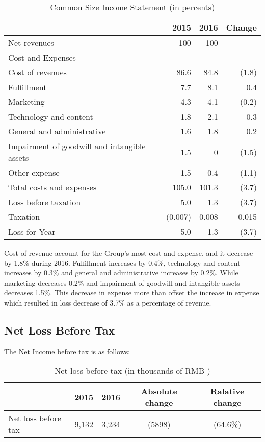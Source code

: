 \begin{table}[H]	
	\begin{center}
		\begin{tabular}{lrrr}
			\toprule
			&\textbf{2015}&\textbf{2016}&\textbf{Change}\\
			\midrule
			Net revenues&	100&	100&	-\\
			Cost and Expenses& & & \\			
			Cost of revenues&	86.6&	84.8&	(1.8)\\
			Fulfillment&7.7&	8.1	&	0.4\\
			Marketing&	4.3&	4.1	&(0.2)\\
			Technology and content&	1.8&	2.1&	0.3\\
			General and administrative&	1.6	&1.8&	0.2\\
			Impairment of goodwill and intangible assets&	1.5&0&	(1.5)\\
			Other expense&1.5&	0.4	&	(1.1)\\
			Total costs and expenses&	105.0&	101.3&	(3.7)\\
			Loss before taxation&5.0&	1.3	&	(3.7)\\
			Taxation&	(0.007)&	0.008&	0.015\\
			Loss for Year	&5.0&	1.3&	(3.7)\\
			\bottomrule
		\end{tabular}
	\end{center}
	\caption{Common Size Income Statement (in percents)}\label{table:1}
\end{table}

Cost of revenue account for the Group’s most cost and expense, and it decrease by 1.8\% during 2016. Fulfillment increases by 0.4\%, technology and content increases by 0.3\% and general and administrative increases by 0.2\%. While marketing decreases 0.2\% and impairment of goodwill and intangible assets decreases 1.5\%. This decrease in expense more than offset the increase in expense which resulted in loss decrease of 3.7\% as a percentage of revenue.


\subsection{Net Loss Before Tax}
The Net Income before tax is as follows:

\begin{table}[H]	
	\begin{center}
		\begin{tabular}{lcccc}
			\toprule
			&\textbf{2015}&\textbf{2016}&\textbf{Absolute change}&\textbf{Ralative change}\\
			
			\midrule
			Net loss before tax&9,132&3,234&(5898)&(64.6\%)\\
			\bottomrule
		\end{tabular}
	\end{center}
	\caption{Net loss before tax (in thousands of RMB \textyen)}\label{table:1}
\end{table}

